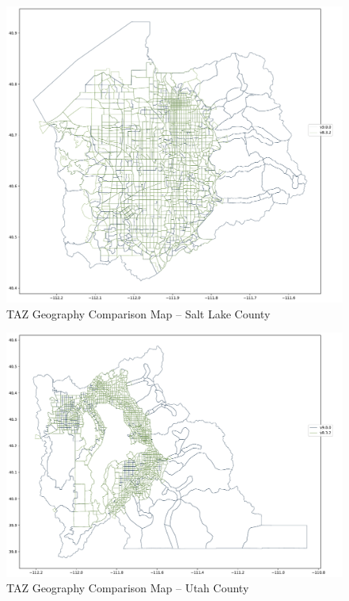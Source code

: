 \documentclass[
  letterpaper,
  DIV=11,
  numbers=noendperiod,
  titlepage=false]{scrreprt}
\begin{document}
\begin{figure}[H]

{\centering \includegraphics{v9x/v900/whats-new/2-inputdata_files/figure-pdf/fig-taz-compare-sl-pdf-output-1.pdf}

}

\caption{\label{fig-taz-compare-sl-pdf}TAZ Geography Comparison Map --
Salt Lake County}

\end{figure}

\begin{figure}[H]

{\centering \includegraphics{v9x/v900/whats-new/2-inputdata_files/figure-pdf/fig-taz-compare-utah-pdf-output-1.pdf}

}

\caption{\label{fig-taz-compare-utah-pdf}TAZ Geography Comparison Map --
Utah County}

\end{figure}
\end{document}
